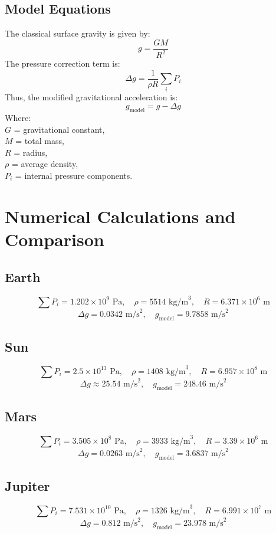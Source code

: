 \documentclass[12pt,a4paper]{article}
\begin{document}
\subsection{Model Equations}
The classical surface gravity is given by:
\[ g = \frac{GM}{R^{2}} \]
The pressure correction term is:
\[ \Delta g = \frac{1}{\rho R} \sum_i P_i \]
Thus, the modified gravitational acceleration is:
\[ g_{\text{model}} = g - \Delta g \]
Where:\\
$G$ = gravitational constant,\\
$M$ = total mass,\\
$R$ = radius,\\
$\rho$ = average density,\\
$P_i$ = internal pressure components.

\section{Numerical Calculations and Comparison}
\subsection{Earth}
\[ \sum P_i = 1.202 \times 10^{9} \text{ Pa}, \quad \rho = 5514 \text{ kg/m}^3, \quad R = 6.371 \times 10^{6} \text{ m} \]
\[ \Delta g = 0.0342 \text{ m/s}^2, \quad g_{\text{model}} = 9.7858 \text{ m/s}^2 \]

\subsection{Sun}
\[ \sum P_i = 2.5 \times 10^{13} \text{ Pa}, \quad \rho = 1408 \text{ kg/m}^3, \quad R = 6.957 \times 10^{8} \text{ m} \]
\[ \Delta g \approx 25.54 \text{ m/s}^2, \quad g_{\text{model}} = 248.46 \text{ m/s}^2 \]

\subsection{Mars}
\[ \sum P_i = 3.505 \times 10^{8} \text{ Pa}, \quad \rho = 3933 \text{ kg/m}^3, \quad R = 3.39 \times 10^{6} \text{ m} \]
\[ \Delta g = 0.0263 \text{ m/s}^2, \quad g_{\text{model}} = 3.6837 \text{ m/s}^2 \]

\subsection{Jupiter}
\[ \sum P_i = 7.531 \times 10^{10} \text{ Pa}, \quad \rho = 1326 \text{ kg/m}^3, \quad R = 6.991 \times 10^{7} \text{ m} \]
\[ \Delta g = 0.812 \text{ m/s}^2, \quad g_{\text{model}} = 23.978 \text{ m/s}^2 \]
\end{document}
